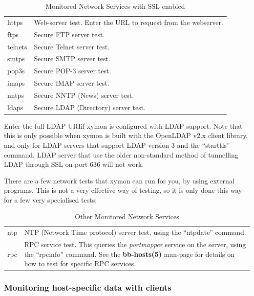 \begin{table} \centering \caption{Monitored Network Services with SSL enabled} \label{Monitored_Network_Services_SSL}
\begin{tabular}{l|l}
https & Web-server test. Enter the URL to request from the webserver.\\ 
ftps & Secure FTP server test. \\
telnets & Secure Telnet server test. \\
smtps & Secure SMTP server test. \\
pop3s & Secure POP-3 server test. \\
imaps & Secure IMAP server test. \\
nntps & Secure NNTP (News) server test. \\
ldaps & Secure LDAP (Directory) server test.
\end{tabular}

\end{table}

Enter the full LDAP URIif xymon is configured with LDAP support. Note that this is only
possible when xymon is built with the OpenLDAP v2.x client library,
and only for LDAP servers that support LDAP version 3 and the
``starttls'' command. LDAP server that use the older non-standard
method of tunnelling LDAP through SSL on port 636 will not work.





 There are a few network tests that xymon can run for you, by using
 external programs. This is not a very effective way of testing, so it
 is only done this way for a few very specialised tests:


\begin{table} \centering \caption{Other Monitored Network Services} \label{Other_Monitored_Network_Services}
\begin{tabular}{l|l}
ntp & NTP (Network Time protocol) server test, using the ``ntpdate'' command. \\
rpc & RPC service test. This queries the \emph{portmapper} service on
the server, using the ``rpcinfo'' command. See the
\textbf{bb-hosts(5)} man-page for details on how to test for specific
RPC services.

\end{tabular}
\end{table}

\subsubsection{Monitoring host-specific data with clients}


